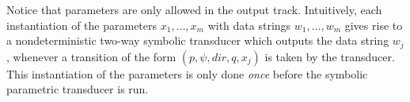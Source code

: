 Notice that parameters are only allowed in the output track.
Intuitively, each instantiation of the parameters $x_1,\ldots, x_m$ with data strings 
$w_1,\ldots, w_m$ gives rise to a nondeterministic two-way symbolic transducer which outputs
the data string $w_j$, whenever a transition of the form $(p, \psi, dir, q, x_j)$ is
taken by the transducer. This instantiation of the parameters is only done 
\emph{once} before the symbolic parametric transducer is run.

